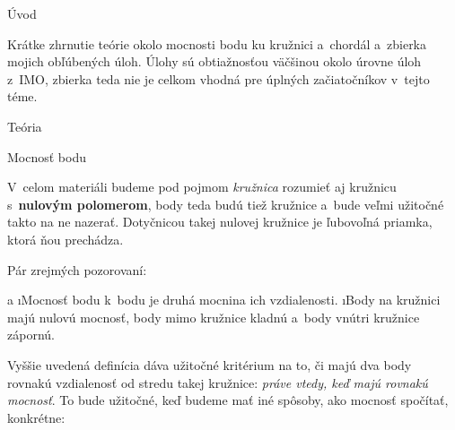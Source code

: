 

\let\angle\sphericalangle





\sec Úvod

Krátke zhrnutie teórie okolo mocnosti bodu ku kružnici a~chordál a~zbierka mojich obľúbených úloh. Úlohy sú obtiažnosťou väčšinou okolo úrovne úloh z~IMO, zbierka teda nie je celkom vhodná pre úplných začiatočníkov v~tejto téme.

\sec Teória

\secc Mocnosť bodu

V~celom materiáli budeme pod pojmom \textit{kružnica} rozumieť aj kružnicu s~\textbf{nulovým polomerom}, body teda budú tiež kružnice a~bude veľmi užitočné takto na ne nazerať. Dotyčnicou takej nulovej kružnice je ľubovoľná priamka, ktorá ňou prechádza.


Pár zrejmých pozorovaní:

\begitems \style a
\i Mocnosť bodu k~bodu je druhá mocnina ich vzdialenosti.
\i Body na kružnici majú nulovú mocnosť, body mimo kružnice kladnú a~body vnútri kružnice zápornú.
\enditems

Vyššie uvedená definícia dáva užitočné kritérium na to, či majú dva body rovnakú vzdialenosť od stredu takej kružnice: \textit{práve vtedy, keď majú rovnakú mocnosť}. To bude užitočné, keď budeme mať iné spôsoby, ako mocnosť spočítať, konkrétne:


